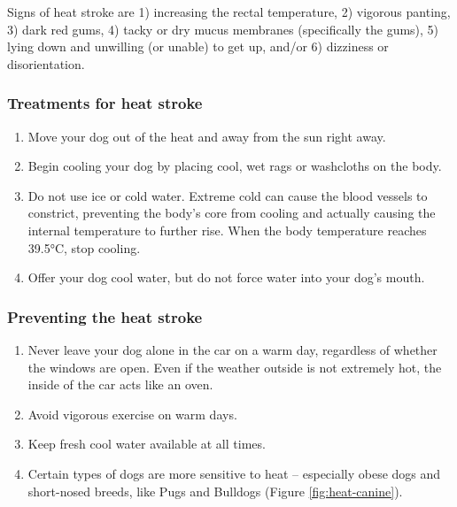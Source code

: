 \documentclass[]{book}
\providecommand{\tightlist}{%
  \setlength{\itemsep}{0pt}\setlength{\parskip}{0pt}}
\begin{document}
Signs of heat stroke are 1) increasing the rectal temperature, 2) vigorous panting, 3) dark red gums, 4) tacky or dry mucus membranes (specifically the gums), 5) lying down and unwilling (or unable) to get up, and/or 6) dizziness or disorientation.

\hypertarget{treatments-for-heat-stroke}{%
\subsubsection{Treatments for heat stroke}\label{treatments-for-heat-stroke}}

\begin{enumerate}
\def\labelenumi{\arabic{enumi}.}
\tightlist
\item
  Move your dog out of the heat and away from the sun right away.\\
\item
  Begin cooling your dog by placing cool, wet rags or washcloths on the body.\\
\item
  Do not use ice or cold water. Extreme cold can cause the blood vessels to constrict, preventing the body's core from cooling and actually causing the internal temperature to further rise. When the body temperature reaches 39.5°C, stop cooling.
\item
  Offer your dog cool water, but do not force water into your dog's mouth.
\end{enumerate}

\hypertarget{preventing-the-heat-stroke}{%
\subsubsection{Preventing the heat stroke}\label{preventing-the-heat-stroke}}

\begin{enumerate}
\def\labelenumi{\arabic{enumi}.}
\tightlist
\item
  Never leave your dog alone in the car on a warm day, regardless of whether the windows are open. Even if the weather outside is not extremely hot, the inside of the car acts like an oven.\\
\item
  Avoid vigorous exercise on warm days.\\
\item
  Keep fresh cool water available at all times.\\
\item
  Certain types of dogs are more sensitive to heat -- especially obese dogs and short-nosed breeds, like Pugs and Bulldogs (Figure \ref{fig:heat-canine}).
\end{enumerate}
\end{document}
